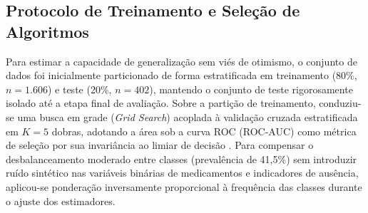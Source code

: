 \documentclass[conference]{IEEEtran}
\begin{document}
\subsection{Protocolo de Treinamento e Seleção de Algoritmos}
Para estimar a capacidade de generalização sem viés de otimismo, o conjunto de dados foi inicialmente particionado de forma estratificada em treinamento (80\%, $n = 1.606$) e teste (20\%, $n = 402$), mantendo o conjunto de teste rigorosamente isolado até a etapa final de avaliação. Sobre a partição de treinamento, conduziu-se uma busca em grade (\textit{Grid Search}) acoplada à validação cruzada estratificada em $K = 5$ dobras, adotando a área sob a curva ROC (ROC-AUC) como métrica de seleção por sua invariância ao limiar de decisão \cite{b4}. Para compensar o desbalanceamento moderado entre classes (prevalência de 41,5\%) sem introduzir ruído sintético nas variáveis binárias de medicamentos e indicadores de ausência, aplicou-se ponderação inversamente proporcional à frequência das classes durante o ajuste dos estimadores.
\end{document}
